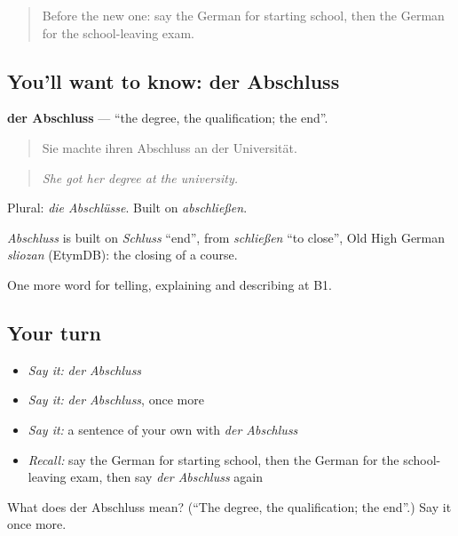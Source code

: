 \begin{quote}
Before the new one: say the German for starting school, then the German for the school-leaving exam.
\end{quote}

\subsection*{You'll want to know: der Abschluss}
\textbf{der Abschluss} — \textquotedblleft{}the degree, the qualification; the end\textquotedblright{}.

\begin{quote}
Sie machte ihren Abschluss an der Universität.
\end{quote}

\begin{quote}
\emph{She got her degree at the university.}
\end{quote}

Plural: \emph{die Abschlüsse}. Built on \emph{abschließen}.

\begin{cousinweb}
\emph{Abschluss} is built on \emph{Schluss} \textquotedblleft{}end\textquotedblright{}, from \emph{schließen} \textquotedblleft{}to close\textquotedblright{}, Old High German \emph{sliozan} (EtymDB): the closing of a course.
\end{cousinweb}

\begin{grammarlens}[title={What you've built}]
One more word for telling, explaining and describing at B1.
\end{grammarlens}

\subsection*{Your turn}
\begin{itemize}
\raggedright
  \item \emph{Say it:} \emph{der Abschluss}
  \item \emph{Say it:} \emph{der Abschluss}, once more
  \item \emph{Say it:} a sentence of your own with \emph{der Abschluss}
  \item \emph{Recall:} say the German for starting school, then the German for the school-leaving exam, then say \emph{der Abschluss} again
\end{itemize}

\begin{tcolorbox}[breakable,colback=teal!4,colframe=teal!35!black,title={Before you move on}]
What does der Abschluss mean? (\textquotedblleft{}The degree, the qualification; the end\textquotedblright{}.) Say it once more.
\end{tcolorbox}

